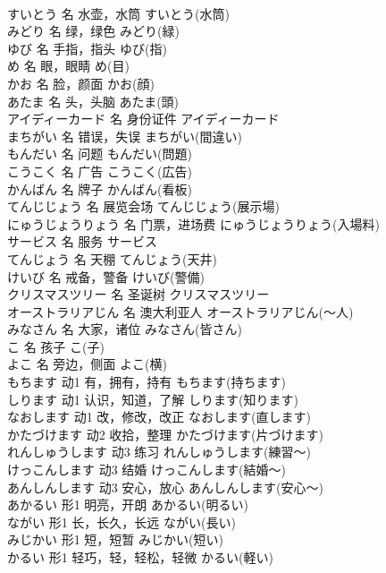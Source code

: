 \documentclass[8pt]{extreport}
\begin{document}
\begin{CJK}{UTF8}{min}
\\	すいとう	名	水壶，水筒	すいとう(水筒)	
\\	みどり	名	绿，绿色	みどり(緑)	
\\	ゆび	名	手指，指头	ゆび(指)	
\\	め	名	眼，眼睛	め(目)	
\\	かお	名	脸，颜面	かお(顔)	
\\	あたま	名	头，头脑	あたま(頭)	
\\	アイディーカード	名	身份证件	アイディーカード
\\	まちがい	名	错误，失误	まちがい(間違い)	
\\	もんだい	名	问题	もんだい(問題)	
\\	こうこく	名	广告	こうこく(広告)	
\\	かんばん	名	牌子	かんばん(看板)	
\\	てんじじょう	名	展览会场	てんじじょう(展示場)	
\\	にゅうじょうりょう	名	门票，进场费	にゅうじょうりょう(入場料)	
\\	サービス	名	服务	サービス	
\\	てんじょう	名	天棚	てんじょう(天井)	
\\	けいび	名	戒备，警备	けいび(警備)	
\\	クリスマスツリー	名	圣诞树	クリスマスツリー	
\\	オーストラリアじん	名	澳大利亚人	オーストラリアじん(～人)	
\\	みなさん	名	大家，诸位	みなさん(皆さん)	
\\	こ	名	孩子	こ(子)	
\\	よこ	名	旁边，侧面	よこ(横)	
\\	もちます	动1	有，拥有，持有	もちます(持ちます)	
\\	しります	动1	认识，知道，了解	しります(知ります)	
\\	なおします	动1	改，修改，改正	なおします(直します)	
\\	かたづけます	动2	收拾，整理	かたづけます(片づけます)	
\\	れんしゅうします	动3	练习	れんしゅうします(練習～)	
\\	けっこんします	动3	结婚	けっこんします(結婚～)	
\\	あんしんします	动3	安心，放心	あんしんします(安心～)	
\\	あかるい	形1	明亮，开朗	あかるい(明るい)	
\\	ながい	形1	长，长久，长远	ながい(長い)	
\\	みじかい	形1	短，短暂	みじかい(短い)	
\\	かるい	形1	轻巧，轻，轻松，轻微	かるい(軽い)	

\end{CJK}
\end{document}

